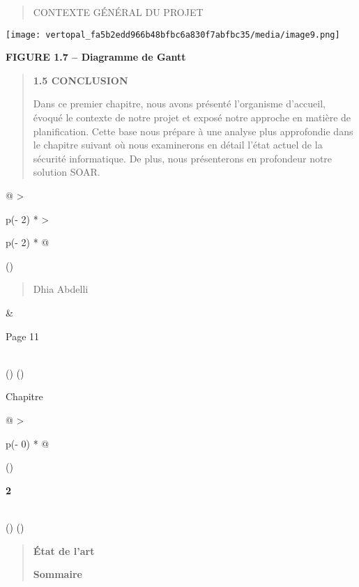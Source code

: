 \documentclass[
]{article}
\begin{document}
\begin{quote}
CONTEXTE GÉNÉRAL DU PROJET
\end{quote}

\texttt{[image: vertopal\_fa5b2edd966b48bfbc6a830f7abfbc35/media/image9.png]}

\textbf{FIGURE 1.7 -- Diagramme de Gantt}

\begin{quote}
\textbf{1.5 CONCLUSION}

Dans ce premier chapitre, nous avons présenté l'organisme d'accueil,
évoqué le contexte de notre projet et exposé notre approche en matière
de planification. Cette base nous prépare à une analyse plus approfondie
dans le chapitre suivant où nous examinerons en détail l'état actuel de
la sécurité informatique. De plus, nous présenterons en profondeur notre
solution SOAR.
\end{quote}

\begin{longtable}[]{@{}
  >{\raggedright\arraybackslash}p{(\columnwidth - 2\tabcolsep) * }
  >{\raggedright\arraybackslash}p{(\columnwidth - 2\tabcolsep) * }@{}}
\toprule()
\begin{minipage}[b]{\linewidth}\raggedright
\begin{quote}
Dhia Abdelli
\end{quote}
\end{minipage} & \begin{minipage}[b]{\linewidth}\raggedright
Page 11
\end{minipage} \\
\midrule()
\endhead
\bottomrule()
\end{longtable}

Chapitre

\begin{longtable}[]{@{}
  >{\raggedright\arraybackslash}p{(\columnwidth - 0\tabcolsep) * }@{}}
\toprule()
\begin{minipage}[b]{\linewidth}\raggedright
\textbf{2}
\end{minipage} \\
\midrule()
\endhead
\bottomrule()
\end{longtable}

\begin{quote}
\textbf{État de l'art}

\textbf{Sommaire}
\end{quote}
\end{document}
